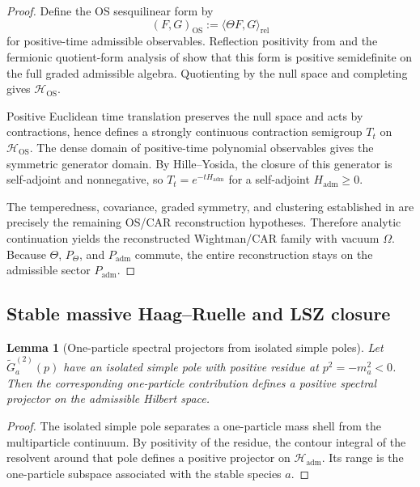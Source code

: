 \documentclass[11pt,a4paper]{article}
\newtheorem{lemma}[theorem]{Lemma}
\theoremstyle{definition}
\theoremstyle{remark}
\newcommand{\Padm}{P_{\mathrm{adm}}}
\begin{document}
\begin{proof}
Define the OS sesquilinear form by
\[
(F,G)_{\mathrm{OS}}:=\langle \Theta F,G\rangle_{\mathrm{rel}}
\]
for positive-time admissible observables. Reflection positivity from
 and the fermionic quotient-form analysis of
 show that this form is positive semidefinite on the full graded admissible
algebra. Quotienting by the null space and completing gives $\mathcal H_{\mathrm{OS}}$.

Positive Euclidean time translation preserves the null space and acts by contractions, hence defines
a strongly continuous contraction semigroup $T_t$ on $\mathcal H_{\mathrm{OS}}$. The dense domain of
positive-time polynomial observables gives the symmetric generator domain. By Hille--Yosida, the
closure of this generator is self-adjoint and nonnegative, so $T_t=e^{-tH_{\mathrm{adm}}}$ for a
self-adjoint $H_{\mathrm{adm}}\ge 0$.

The temperedness, covariance, graded symmetry, and clustering established in
 are precisely the
remaining OS/CAR reconstruction hypotheses. Therefore analytic continuation yields the reconstructed
Wightman/CAR family with vacuum $\Omega$. Because $\Theta$, $P_\Theta$, and $\Padm$ commute, the
entire reconstruction stays on the admissible sector $\Padm$.
\end{proof}

\subsection{Stable massive Haag--Ruelle and LSZ closure}

\begin{lemma}[One-particle spectral projectors from isolated simple poles]
\label{lem:one-particle-projectors-from-poles}
Let $\widetilde G_a^{(2)}(p)$ have an isolated simple pole with positive residue at
$p^2=-m_a^2<0$. Then the corresponding one-particle contribution defines a positive spectral
projector on the admissible Hilbert space.
\end{lemma}

\begin{proof}
The isolated simple pole separates a one-particle mass shell from the multiparticle continuum. By
positivity of the residue, the contour integral of the resolvent around that pole defines a positive
projector on $\mathcal H_{\mathrm{adm}}$. Its range is the one-particle subspace associated with the
stable species $a$.
\end{proof}
\end{document}
